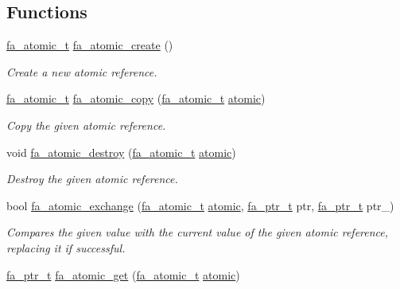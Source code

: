 \subsection*{Functions}
\begin{DoxyCompactItemize}
\item 
\hyperlink{group___fa_atomic_gaa3c9a8cdc36169052d96fa152e2eb9ae}{fa\-\_\-atomic\-\_\-t} \hyperlink{group___fa_atomic_ga4342c7467122777598bda9c4fbe55b8d}{fa\-\_\-atomic\-\_\-create} ()
\begin{DoxyCompactList}\small\item\em Create a new atomic reference. \end{DoxyCompactList}\item 
\hyperlink{group___fa_atomic_gaa3c9a8cdc36169052d96fa152e2eb9ae}{fa\-\_\-atomic\-\_\-t} \hyperlink{group___fa_atomic_ga202aa48a1cdf0904cc124c7a79c49396}{fa\-\_\-atomic\-\_\-copy} (\hyperlink{group___fa_atomic_gaa3c9a8cdc36169052d96fa152e2eb9ae}{fa\-\_\-atomic\-\_\-t} \hyperlink{util_8h_a5181e62dd55d17e3c1fd4ad40865f737}{atomic})
\begin{DoxyCompactList}\small\item\em Copy the given atomic reference. \end{DoxyCompactList}\item 
void \hyperlink{group___fa_atomic_gafd51f6eb1c2815d3f7cd6d571be2f3da}{fa\-\_\-atomic\-\_\-destroy} (\hyperlink{group___fa_atomic_gaa3c9a8cdc36169052d96fa152e2eb9ae}{fa\-\_\-atomic\-\_\-t} \hyperlink{util_8h_a5181e62dd55d17e3c1fd4ad40865f737}{atomic})
\begin{DoxyCompactList}\small\item\em Destroy the given atomic reference. \end{DoxyCompactList}\item 
bool \hyperlink{group___fa_atomic_ga3a965277fde384ba27a422cb80fda193}{fa\-\_\-atomic\-\_\-exchange} (\hyperlink{group___fa_atomic_gaa3c9a8cdc36169052d96fa152e2eb9ae}{fa\-\_\-atomic\-\_\-t} \hyperlink{util_8h_a5181e62dd55d17e3c1fd4ad40865f737}{atomic}, \hyperlink{group___fa_ga915ddeae99ad7568b273d2b876425197}{fa\-\_\-ptr\-\_\-t} ptr, \hyperlink{group___fa_ga915ddeae99ad7568b273d2b876425197}{fa\-\_\-ptr\-\_\-t} ptr\-\_\-)
\begin{DoxyCompactList}\small\item\em Compares the given value with the current value of the given atomic reference, replacing it if successful. \end{DoxyCompactList}\item 
\hyperlink{group___fa_ga915ddeae99ad7568b273d2b876425197}{fa\-\_\-ptr\-\_\-t} \hyperlink{group___fa_atomic_gae9136728ae2e5c0f75c29c5a262c510a}{fa\-\_\-atomic\-\_\-get} (\hyperlink{group___fa_atomic_gaa3c9a8cdc36169052d96fa152e2eb9ae}{fa\-\_\-atomic\-\_\-t} \hyperlink{util_8h_a5181e62dd55d17e3c1fd4ad40865f737}{atomic})

\end{DoxyCompactItemize}

